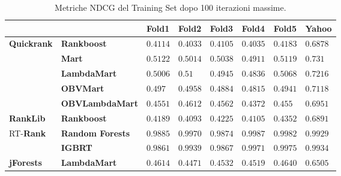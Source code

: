 		\begin{table}[!h]
			\centering
			\begin{tabular}{ll|l|l|l|l|l|l|}
				&& \textbf{Fold1} & \textbf{Fold2} & \textbf{Fold3} & \textbf{Fold4} & \textbf{Fold5} & \textbf{Yahoo}\\
				\hline
				\multirow{5}{*}{\textbf{Quickrank}} & \textbf{Rankboost} & $0.4114$ & $0.4033$ & $0.4105$ & $0.4035$ & $0.4183$ & $0.6878$\\
				\cline{2-8}
				& \textbf{Mart} & $0.5122$ & $0.5014$ & $0.5038$ & $0.4911$ & $0.5119$ & $0.731$\\
				\cline{2-8}
				& \textbf{LambdaMart} & $0.5006$ & $0.51$ & $0.4945$ & $0.4836$ & $0.5068$ & $0.7216$\\
				\cline{2-8}
				& \textbf{OBVMart} & $0.497$ & $0.4958$ & $0.4884$ & $0.4815$ & $0.4941$ & $0.7118$\\
				\cline{2-8}
				& \textbf{OBVLambdaMart} & $0.4551$ & $0.4612$ & $0.4562$ & $0.4372$ & $0.455$ & $0.6951$\\
				\hline
				\textbf{RankLib} & \textbf{Rankboost} & $0.4189$ & $0.4093$ & $0.4225$ & $0.4105$ & $0.4352$ & $0.6891$\\
				\hline
				\multirow{2}{*}{RT-\textbf{Rank}} & \textbf{Random Forests} & $0.9885$ & $0.9970$ & $0.9874$ & $0.9987$ & $0.9982$ & $0.9929$\\
				\cline{2-8}
				& \textbf{IGBRT} & $0.9861$ & $0.9939$ & $0.9867$ & $0.9971$ & $0.9975$ & $0.9934$\\
				\hline
				\textbf{jForests} & \textbf{LambdaMart} & $0.4614$ & $0.4471$ & $0.4532$ & $0.4519$ & $0.4640$ & $0.6505$\\
				\hline
			\end{tabular}
			\caption{Metriche NDCG del Training Set dopo 100 iterazioni massime.}
			\label{fig:train_100}
		\end{table}
		
